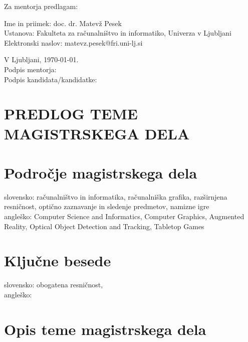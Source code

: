 \documentclass[a4paper, 12pt]{article}
\begin{document}
Za mentorja predlagam:

\hfill\begin{minipage}{\dimexpr\textwidth-2cm}
Ime in priimek: doc. dr. Matevž Pesek\\
Ustanova: Fakulteta za računalništvo in informatiko, Univerza v Ljubljani\\
Elektronski naslov: matevz.pesek@fri.uni-lj.si
\end{minipage}

\bigskip


\hfill V Ljubljani, \today. \\
%
\hfill Podpis mentorja: \hspace{180px} \\ Podpis kandidata/kandidatke:    




\clearpage
\section*{PREDLOG TEME MAGISTRSKEGA DELA}

\section{Področje magistrskega dela}

slovensko: računalništvo in informatika, računalniška grafika, razširnjena resničnost, optično zaznavanje in sledenje predmetov, namizne igre\\
angleško: Computer Science and Informatics, Computer Graphics, Augmented Reality, Optical Object Detection and Tracking, Tabletop Games


\section{Ključne besede}

slovensko: obogatena resničnost,  \\
angleško:


\section{Opis teme magistrskega dela}
\end{document}
